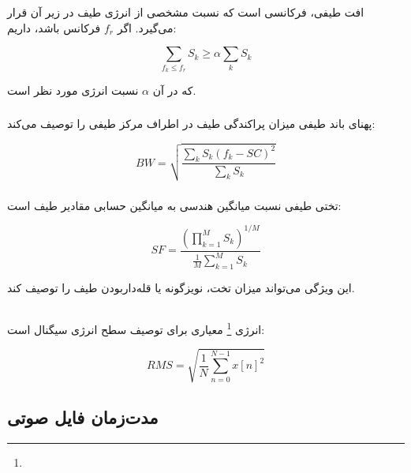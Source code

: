 افت طیفی، فرکانسی است که نسبت مشخصی از انرژی طیف در زیر آن قرار می‌گیرد. اگر $f_r$ فرکانس
باشد، داریم:

\begin{equation}
\sum_{f_k\leq f_r}S_k
\geq
\alpha
\sum_k S_k
\end{equation}

که در آن $\alpha$ نسبت انرژی مورد نظر است.


\subsubsection{}

پهنای باند طیفی میزان پراکندگی طیف در اطراف مرکز طیفی را توصیف می‌کند:

\begin{equation}
BW
=
\sqrt{
\frac{
\sum_k S_k(f_k-SC)^2
}{
\sum_k S_k
}
}
\end{equation}


\subsubsection{}

تختی طیفی نسبت میانگین هندسی به میانگین حسابی مقادیر طیف است:

\begin{equation}
SF
=
\frac{
\left(\prod_{k=1}^{M}S_k\right)^{1/M}
}{
\frac{1}{M}\sum_{k=1}^{M}S_k
}
\end{equation}

این ویژگی می‌تواند میزان تخت، نویزگونه یا قله‌داربودن طیف را توصیف کند.


\subsection{}

انرژی
\footnote{}
معیاری برای توصیف سطح انرژی سیگنال است:

\begin{equation}
RMS
=
\sqrt{
\frac{1}{N}
\sum_{n=0}^{N-1}x[n]^2
}
\end{equation}


\subsection{مدت‌زمان فایل صوتی}

